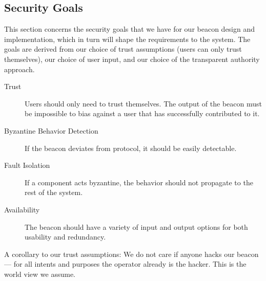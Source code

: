 \subsection{Security Goals}
This section concerns the security goals that we have for our beacon design and implementation, which in turn will shape the requirements to the system. The goals are derived from our choice of trust assumptions (users can only trust themselves), our choice of user input, and our choice of the transparent authority approach.

\begin{description}
    \item [Trust] Users should only need to trust themselves. The output of the beacon must be impossible to bias against a user that has successfully contributed to it.
    \item [Byzantine Behavior Detection] If the beacon deviates from protocol, it should be easily detectable.
    \item [Fault Isolation] If a component acts byzantine, the behavior should not propagate to the rest of the system.
    \item [Availability] The beacon should have a variety of input and output options for both usability and redundancy. 
\end{description}

A corollary to our trust assumptions:
We do not care if anyone hacks our beacon --- for all intents and purposes the operator already is the hacker. This is the world view we assume.
